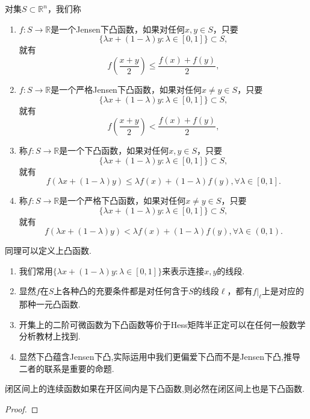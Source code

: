 \documentclass[lang=cn,newtx,10pt,scheme=chinese]{elegantbook}
\begin{document}
\begin{definition}[下凸函数的定义]\label{definition:下凸函数的定义}
对集\(S\subset\mathbb{R}^n\)，我们称
\begin{enumerate}
\item \(f:S\to\mathbb{R}\)是一个Jensen下凸函数，如果对任何\(x,y\in S\)，只要
\[\{\lambda x+(1 - \lambda)y:\lambda\in[0,1]\}\subset S,\]
就有
\[f\left(\frac{x + y}{2}\right)\leqslant\frac{f(x)+f(y)}{2},\]

\item \(f:S\to\mathbb{R}\)是一个严格Jensen下凸函数，如果对任何\(x\neq y\in S\)，只要
\[\{\lambda x+(1 - \lambda)y:\lambda\in[0,1]\}\subset S,\]
就有
\[f\left(\frac{x + y}{2}\right)<\frac{f(x)+f(y)}{2},\]

\item 称\(f:S\to\mathbb{R}\)是一个下凸函数，如果对任何\(x,y\in S\)，只要
\[\{\lambda x+(1 - \lambda)y:\lambda\in[0,1]\}\subset S,\]
就有
\[f(\lambda x+(1 - \lambda)y)\leqslant\lambda f(x)+(1 - \lambda)f(y),\forall\lambda\in[0,1].\]

\item 称\(f:S\to\mathbb{R}\)是一个严格下凸函数，如果对任何\(x\neq y\in S\)，只要
\[\{\lambda x+(1 - \lambda)y:\lambda\in[0,1]\}\subset S,\]
就有
\[f(\lambda x+(1 - \lambda)y)<\lambda f(x)+(1 - \lambda)f(y),\forall\lambda\in(0,1).\]
\end{enumerate}
\end{definition}
\begin{remark}
同理可以定义上凸函数.
\end{remark}
\begin{note}
\begin{enumerate}
\item 我们常用\(\{\lambda x+(1 - \lambda)y:\lambda\in[0,1]\}\)来表示连接\(x,y\)的线段.

\item 显然\(f\)在\(S\)上各种凸的充要条件都是对任何含于\(S\)的线段\(\ell\)，都有\(f|_{\ell}\)上是对应的那种一元凸函数.

\item 开集上的二阶可微函数为下凸函数等价于Hess矩阵半正定可以在任何一般数学分析教材上找到. 

\item 显然下凸蕴含Jensen下凸,实际运用中我们更偏爱下凸而不是Jensen下凸,推导二者的联系是重要的命题. 
\end{enumerate}
\end{note}

\begin{proposition}\label{proposition:开区间下凸闭区间连续的函数在闭区间上仍然下凸}
闭区间上的连续函数如果在开区间内是下凸函数,则必然在闭区间上也是下凸函数.
\end{proposition}
\begin{proof}
   
\end{proof}
\end{document}
